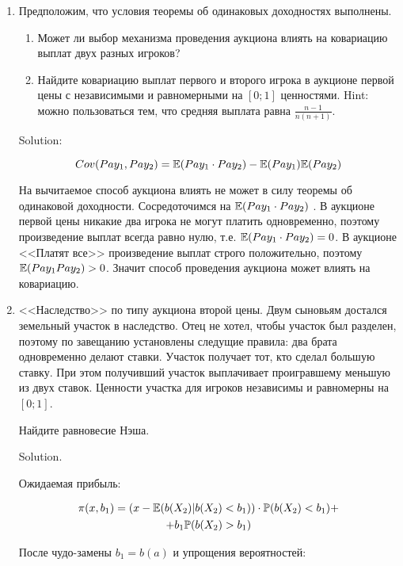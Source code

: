 

\begin{enumerate}
\item Предположим, что условия теоремы об одинаковых доходностях выполнены. 
\begin{enumerate}
\item Может ли выбор механизма проведения аукциона влиять на ковариацию выплат двух разных игроков?
\item  Найдите ковариацию выплат первого и второго игрока в аукционе первой цены с независимыми и равномерными на $ [0;1] $ ценностями. Hint: можно пользоваться тем, что средняя выплата равна $ \frac{n-1}{n(n+1)} $.
\end{enumerate}

Solution:

\begin{equation}
Cov(Pay_{1},Pay_{2})=\mathbb{E}(Pay_{1}\cdot Pay_{2})-\mathbb{E}(Pay_{1})\mathbb{E}(Pay_{2}) 
\end{equation}

На вычитаемое способ аукциона влиять не может в силу теоремы об одинаковой доходности. Сосредоточимся на $\mathbb{E}(Pay_{1}\cdot Pay_{2})$ . В аукционе первой цены никакие два игрока не могут платить одновременно, поэтому произведение выплат всегда равно нулю, т.е. $ \mathbb{E}(Pay_{1}\cdot Pay_{2})=0 $. В аукционе <<Платят все>> произведение выплат строго положительно, поэтому $ \mathbb{E}(Pay_{1}Pay_{2})>0 $. Значит способ проведения аукциона может влиять на ковариацию.




\item <<Наследство>> по типу аукциона второй цены. Двум сыновьям достался земельный участок в наследство. Отец не хотел, чтобы участок был разделен, поэтому по завещанию установлены следущие правила: два брата одновременно делают ставки. Участок получает тот, кто сделал большую ставку. При этом получивший участок выплачивает проигравшему меньшую из двух ставок. Ценности участка для игроков независимы и равномерны на $ [0;1] $. 

Найдите равновесие Нэша.

Solution.

Ожидаемая прибыль:

\begin{multline}
\pi(x,b_{1})=(x-\mathbb{E}(b(X_{2})|b(X_{2})<b_{1}))\cdot \mathbb{P}(b(X_{2})<b_{1})+\\
+b_{1}\mathbb{P}(b(X_{2})>b_{1})
\end{multline}

После чудо-замены $ b_{1}=b(a) $ и упрощения вероятностей:


\end{enumerate}
